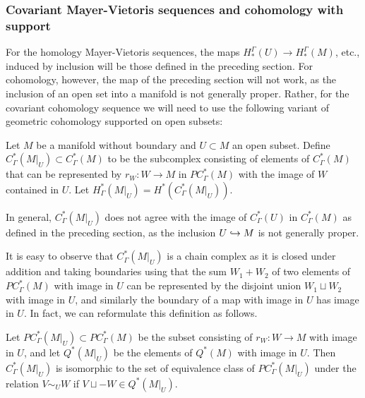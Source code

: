 \subsubsection{Covariant Mayer-Vietoris sequences and cohomology with support}

For the homology Mayer-Vietoris sequences, the maps $H_*^\Gamma(U) \to H_*^\Gamma(M)$, etc., induced by inclusion will be those defined in the preceding section.
For cohomology, however, the map of the preceding section will not work, as the inclusion of an open set into a manifold is not generally proper.
Rather, for the covariant cohomology sequence we will need to use the following variant of geometric cohomology supported on open subsets:

\begin{definition}
	Let $M$ be a manifold without boundary and $U \subset M$ an open subset.
	Define $C_\Gamma^*(M|_U) \subset C_\Gamma^*(M)$ to be the subcomplex consisting of elements of $C_\Gamma^*(M)$ that can be represented by $r_W \colon W \to M$ in $PC^*_\Gamma(M)$ with the image of $W$ contained in $U$.
	Let $H_\Gamma^*(M|_U) = H^*(C_\Gamma^*(M|_U))$.
\end{definition}

In general, $C_\Gamma^*(M|_U)$ does not agree with the image of $C_\Gamma^*(U)$ in $C_\Gamma^*(M)$ as defined in the preceding section, as the inclusion $U \hookrightarrow M$ is not generally proper.

It is easy to observe that $C_\Gamma^*(M|_U)$ is a chain complex as it is closed under addition and taking boundaries using that the sum $W_1+W_2$ of two elements of $PC^*_\Gamma(M)$ with image in $U$ can be represented by the disjoint union $W_1 \sqcup W_2$ with image in $U$, and similarly the boundary of a map with image in $U$ has image in $U$.
In fact, we can reformulate this definition as follows.

\begin{lemma}
	Let $PC_\Gamma^*(M|_U) \subset PC_\Gamma^*(M)$ be the subset consisting of $r_W \colon W \to M$ with image in $U$, and let $Q^*(M|_U)$ be the elements of $Q^*(M)$ with image in $U$.
	Then $C_\Gamma^*(M|_U)$ is isomorphic to the set of equivalence class of $PC_\Gamma^*(M|_U)$ under the relation $V\sim_U W$ if $V \sqcup -W \in Q^*(M|_U)$.
\end{lemma}

